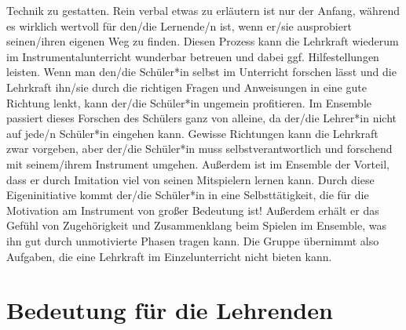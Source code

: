 Technik zu gestatten. Rein verbal etwas zu erläutern ist nur der Anfang, während
es wirklich wertvoll für den/die Lernende/n ist, wenn er/sie ausprobiert
seinen/ihren eigenen Weg zu finden. Diesen Prozess kann die Lehrkraft wiederum
im Instrumentalunterricht wunderbar betreuen und dabei ggf. Hilfestellungen
leisten. Wenn man den/die Schüler*in selbst im Unterricht forschen lässt und die
Lehrkraft ihn/sie durch die richtigen Fragen und Anweisungen in eine gute
Richtung lenkt, kann der/die Schüler*in ungemein profitieren. Im Ensemble
passiert dieses Forschen des Schülers ganz von alleine, da der/die Lehrer*in
nicht auf jede/n Schüler*in eingehen kann. Gewisse Richtungen kann die Lehrkraft
zwar vorgeben, aber der/die Schüler*in muss selbstverantwortlich und forschend
mit seinem/ihrem Instrument umgehen. Außerdem ist im Ensemble der Vorteil, dass
er durch Imitation viel von seinen Mitspielern lernen kann. Durch diese
Eigeninitiative kommt der/die Schüler*in in eine Selbsttätigkeit, die für die
Motivation am Instrument von großer Bedeutung ist! Außerdem erhält er das Gefühl
von Zugehörigkeit und Zusammenklang beim Spielen im Ensemble, was ihn gut durch
unmotivierte Phasen tragen kann. Die Gruppe übernimmt also Aufgaben, die eine
Lehrkraft im Einzelunterricht nicht bieten kann.



\section{Bedeutung für die Lehrenden}

